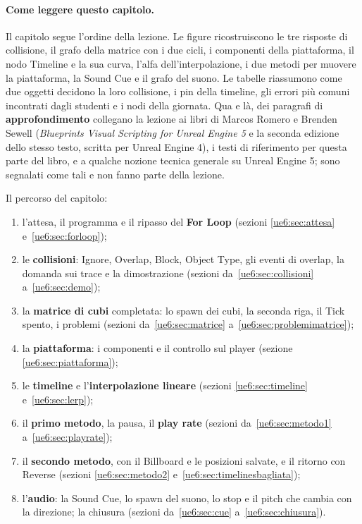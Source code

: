 \paragraph{Come leggere questo capitolo.} Il capitolo segue l'ordine della lezione. Le
figure ricostruiscono le tre risposte di collisione, il grafo della matrice con i due
cicli, i componenti della piattaforma, il nodo Timeline e la sua curva, l'alfa
dell'interpolazione, i due metodi per muovere la piattaforma, la Sound Cue e il grafo del
suono. Le tabelle riassumono come due oggetti decidono la loro collisione, i pin della
timeline, gli errori più comuni incontrati dagli studenti e i nodi della giornata. Qua e
là, dei paragrafi di \textbf{approfondimento} collegano la lezione ai libri di Marcos
Romero e Brenden Sewell (\emph{Blueprints Visual Scripting for Unreal Engine 5} e la
seconda edizione dello stesso testo, scritta per Unreal Engine 4), i testi di
riferimento per questa parte del libro, e a qualche nozione tecnica generale su Unreal
Engine 5; sono segnalati come tali e non fanno parte della lezione.

Il percorso del capitolo:
\begin{enumerate}
  \item l'attesa, il programma e il ripasso del \textbf{For Loop} (sezioni
        \ref{ue6:sec:attesa} e~\ref{ue6:sec:forloop});
  \item le \textbf{collisioni}: Ignore, Overlap, Block, Object Type, gli eventi di
        overlap, la domanda sui trace e la dimostrazione (sezioni
        da~\ref{ue6:sec:collisioni} a~\ref{ue6:sec:demo});
  \item la \textbf{matrice di cubi} completata: lo spawn dei cubi, la seconda riga, il
        Tick spento, i problemi (sezioni da~\ref{ue6:sec:matrice}
        a~\ref{ue6:sec:problemimatrice});
  \item la \textbf{piattaforma}: i componenti e il controllo sul player (sezione
        \ref{ue6:sec:piattaforma});
  \item le \textbf{timeline} e l'\textbf{interpolazione lineare} (sezioni
        \ref{ue6:sec:timeline} e~\ref{ue6:sec:lerp});
  \item il \textbf{primo metodo}, la pausa, il \textbf{play rate} (sezioni
        da~\ref{ue6:sec:metodo1} a~\ref{ue6:sec:playrate});
  \item il \textbf{secondo metodo}, con il Billboard e le posizioni salvate, e il
        ritorno con Reverse (sezioni \ref{ue6:sec:metodo2}
        e~\ref{ue6:sec:timelinesbagliata});
  \item l'\textbf{audio}: la Sound Cue, lo spawn del suono, lo stop e il pitch che
        cambia con la direzione; la chiusura (sezioni da~\ref{ue6:sec:cue}
        a~\ref{ue6:sec:chiusura}).
\end{enumerate}

